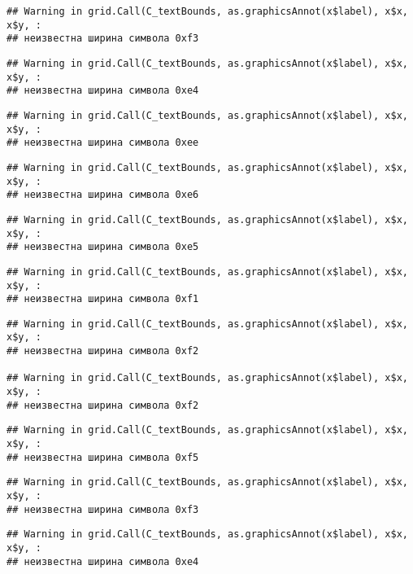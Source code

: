 \documentclass[
]{article}
\begin{document}
\begin{verbatim}
## Warning in grid.Call(C_textBounds, as.graphicsAnnot(x$label), x$x, x$y, :
## неизвестна ширина символа 0xf3
\end{verbatim}

\begin{verbatim}
## Warning in grid.Call(C_textBounds, as.graphicsAnnot(x$label), x$x, x$y, :
## неизвестна ширина символа 0xe4
\end{verbatim}

\begin{verbatim}
## Warning in grid.Call(C_textBounds, as.graphicsAnnot(x$label), x$x, x$y, :
## неизвестна ширина символа 0xee
\end{verbatim}

\begin{verbatim}
## Warning in grid.Call(C_textBounds, as.graphicsAnnot(x$label), x$x, x$y, :
## неизвестна ширина символа 0xe6
\end{verbatim}

\begin{verbatim}
## Warning in grid.Call(C_textBounds, as.graphicsAnnot(x$label), x$x, x$y, :
## неизвестна ширина символа 0xe5
\end{verbatim}

\begin{verbatim}
## Warning in grid.Call(C_textBounds, as.graphicsAnnot(x$label), x$x, x$y, :
## неизвестна ширина символа 0xf1
\end{verbatim}

\begin{verbatim}
## Warning in grid.Call(C_textBounds, as.graphicsAnnot(x$label), x$x, x$y, :
## неизвестна ширина символа 0xf2

## Warning in grid.Call(C_textBounds, as.graphicsAnnot(x$label), x$x, x$y, :
## неизвестна ширина символа 0xf2
\end{verbatim}

\begin{verbatim}
## Warning in grid.Call(C_textBounds, as.graphicsAnnot(x$label), x$x, x$y, :
## неизвестна ширина символа 0xf5
\end{verbatim}

\begin{verbatim}
## Warning in grid.Call(C_textBounds, as.graphicsAnnot(x$label), x$x, x$y, :
## неизвестна ширина символа 0xf3
\end{verbatim}

\begin{verbatim}
## Warning in grid.Call(C_textBounds, as.graphicsAnnot(x$label), x$x, x$y, :
## неизвестна ширина символа 0xe4
\end{verbatim}
\end{document}
